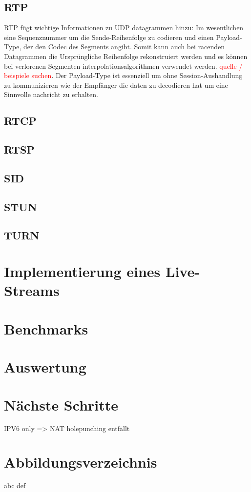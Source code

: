 \documentclass[journal]{IEEEtran}
\begin{document}
\subsection{RTP}

RTP fügt wichtige Informationen zu UDP datagrammen hinzu: Im wesentlichen eine
Sequenznummer um die Sende-Reihenfolge zu codieren und einen Payload-Type, der
den Codec des Segments angibt. Somit kann auch bei racenden Datagrammen die
Ursprüngliche Reihenfolge rekonstruiert werden und es können bei verlorenen
Segmenten interpolationsalgorithmen verwendet werden. \textcolor{red}{quelle /
beispiele suchen}. Der Payload-Type ist essenziell um ohne Session-Aushandlung
zu kommunizieren wie der Empfänger die daten zu decodieren hat um eine
Sinnvolle nachricht zu erhalten.

\lipsum[1-3][3-30]
\subsection{RTCP}
\lipsum[1-4][1-10]
\subsection{RTSP}
\lipsum[1-3][3-30]
\subsection{SID}
\lipsum[1-2][2-3]
\subsection{STUN}
\lipsum[1-4][1-10]
\subsection{TURN}
\lipsum[1-2][2-3]

\section{Implementierung eines Live-Streams}
\lipsum[1-2][2-3]
\section{Benchmarks}
\lipsum[1-4][1-10]
\section{Auswertung}
\lipsum[1-2][2-3]

\section{Nächste Schritte}

\lipsum

\large{IPV6 only => NAT holepunching entfällt}

\section{Abbildungsverzeichnis}
abc
def



\end{document}
